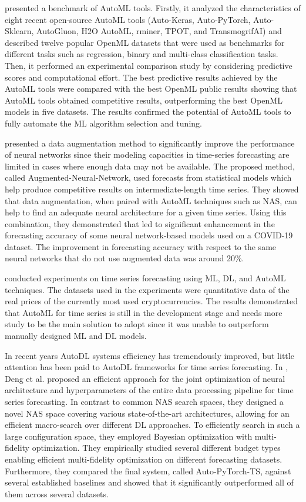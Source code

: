 \cite{9534091} presented a benchmark of AutoML tools.
Firstly, it analyzed the characteristics of eight recent open-source AutoML tools (Auto-Keras, Auto-PyTorch, Auto-Sklearn, AutoGluon, H2O AutoML, rminer, TPOT, and TransmogrifAI) and described twelve popular OpenML datasets that were used as benchmarks for different tasks such as regression, binary and multi-class classification tasks.
Then, it performed an experimental comparison study by considering predictive scores and computational effort.
The best predictive results achieved by the AutoML tools were compared with the best OpenML public results showing that AutoML tools obtained competitive results, outperforming the best OpenML models in five datasets.
The results confirmed the potential of AutoML tools to fully automate the ML algorithm selection and tuning.

\cite{9564380} presented a data augmentation method to significantly improve the performance of neural networks since their modeling capacities in time-series forecasting are limited in cases where enough data may not be available.
The proposed method, called Augmented-Neural-Network, used forecasts from statistical models which help produce competitive results on intermediate-length time series.
They showed that data augmentation, when paired with AutoML techniques such as NAS, can help to find an adequate neural architecture for a given time series.
Using this combination, they demonstrated that led to significant enhancement in the forecasting accuracy of some neural network-based models used on a COVID-19 dataset.
The improvement in forecasting accuracy with respect to the same neural networks that do not use augmented data was around 20\%.

\cite{su142215292} conducted experiments on time series forecasting using ML, DL, and AutoML techniques.
The datasets used in the experiments were quantitative data of the real prices of the currently most used cryptocurrencies.
The results demonstrated that AutoML for time series is still in the development stage and needs more study to be the main solution to adopt since it was unable to outperform manually designed ML and DL models.

In recent years AutoDL systems efficiency has tremendously improved, but little attention has been paid to AutoDL frameworks for time series forecasting.
In \cite{Deng2022}, Deng et al. proposed an efficient approach for the joint optimization of neural architecture and hyperparameters of the entire data processing pipeline for time series forecasting.
In contrast to common NAS search spaces, they designed a novel NAS space covering various state-of-the-art architectures, allowing for an efficient macro-search over different DL approaches.
To efficiently search in such a large configuration space, they employed Bayesian optimization with multi-fidelity optimization.
They empirically studied several different budget types enabling efficient multi-fidelity optimization on different forecasting datasets.
Furthermore, they compared the final system, called Auto-PyTorch-TS, against several established baselines and showed that it significantly outperformed all of them across several datasets.


